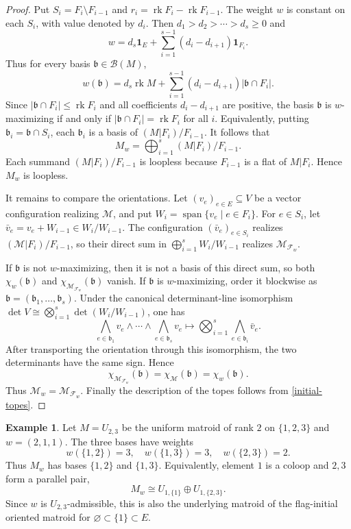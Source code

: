 \documentclass[10pt]{amsart}
\theoremstyle{plain}
\theoremstyle{definition}
\newtheorem{example}[theorem]{Example}
\newcommand{\one}{\mathbf{1}}
\newcommand{\B}{\mathcal{B}}
\newcommand{\F}{\mathcal{F}}
\newcommand{\M}{\mathcal{M}}
\newcommand{\rk}{\operatorname{rk}}
\newcommand{\bb}{\mathfrak{b}}
\begin{document}
\begin{proof}
Put $S_i=F_i\setminus F_{i-1}$ and $r_i=\rk F_i-\rk F_{i-1}$. The weight $w$ is constant on each $S_i$, with value denoted by $d_i$. Then $d_1>d_2>\cdots>d_s\geq 0$ and
\[
w=d_s\one_E+\sum_{i=1}^{s-1}(d_i-d_{i+1})\one_{F_i}.
\]
Thus for every basis $\bb\in\B(M)$,
\[
w(\bb)=d_s\rk M+ \sum_{i=1}^{s-1}(d_i-d_{i+1})|\bb\cap F_i|.
\]
Since $|\bb\cap F_i|\leq\rk F_i$ and all coefficients $d_i-d_{i+1}$ are positive, the basis $\bb$ is $w$-maximizing if and only if $|\bb\cap F_i|=\rk F_i$ for all $i$. Equivalently, putting $\bb_i=\bb\cap S_i$, each $\bb_i$ is a basis of $(M|F_i)/F_{i-1}$. It follows that
\[
M_w=\bigoplus_{i=1}^s(M|F_i)/F_{i-1}.
\]
Each summand $(M|F_i)/F_{i-1}$ is loopless because $F_{i-1}$ is a flat of $M|F_i$. Hence $M_w$ is loopless.

It remains to compare the orientations. Let $(v_e)_{e\in E}\subseteq V$ be a vector configuration realizing $\M$, and put $W_i=\operatorname{span}\{v_e\mid e\in F_i\}$. For $e\in S_i$, let $\bar v_e=v_e+W_{i-1}\in W_i/W_{i-1}$. The configuration $(\bar v_e)_{e\in S_i}$ realizes $(\M|F_i)/F_{i-1}$, so their direct sum in $\bigoplus_{i=1}^sW_i/W_{i-1}$ realizes $\M_{\F_w}$.

If $\bb$ is not $w$-maximizing, then it is not a basis of this direct sum, so both $\chi_w(\bb)$ and $\chi_{\M_{\F_w}}(\bb)$ vanish. If $\bb$ is $w$-maximizing, order it blockwise as $\bb=(\bb_1,\ldots,\bb_s)$. Under the canonical determinant-line isomorphism $\det V\cong\bigotimes_{i=1}^s\det(W_i/W_{i-1})$, one has
\[
\bigwedge_{e\in\bb_1}v_e\wedge\cdots\wedge\bigwedge_{e\in\bb_s}v_e\longmapsto\bigotimes_{i=1}^s\bigwedge_{e\in\bb_i}\bar v_e.
\]
After transporting the orientation through this isomorphism, the two determinants have the same sign. Hence
\[
\chi_{\M_{\F_w}}(\bb)=\chi_{\M}(\bb)=\chi_w(\bb).
\]
Thus $\M_w=\M_{\F_w}$. Finally the description of the topes follows from \eqref{initial-topes}.
\end{proof}

\begin{example}\label{weight-U23}
Let $M=U_{2,3}$ be the uniform matroid of rank $2$ on $\{1,2,3\}$ and $w=(2,1,1)$. The three bases have weights
\[
w(\{1,2\})=3,\quad w(\{1,3\})=3,\quad w(\{2,3\})=2.
\]
Thus $M_w$ has bases $\{1,2\}$ and $\{1,3\}$. Equivalently, element $1$ is a coloop and $2,3$ form a parallel pair,
\[
M_w\cong U_{1,\{1\}}\oplus U_{1,\{2,3\}}.
\]
Since $w$ is $U_{2,3}$-admissible, this is also the underlying matroid of the flag-initial oriented matroid for $\varnothing\subset\{1\}\subset E$.
\end{example}
\end{document}
